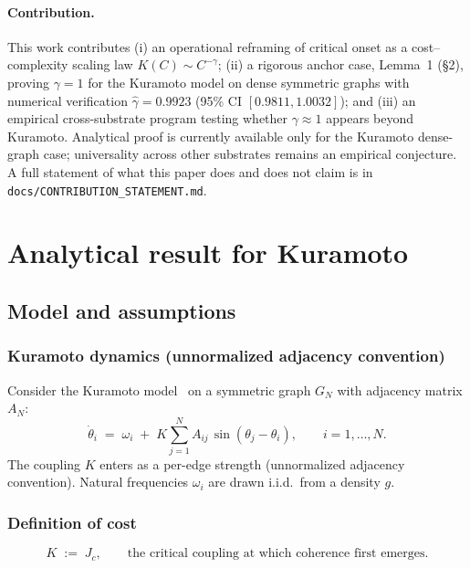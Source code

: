 \documentclass[11pt,a4paper,twocolumn]{article}
\begin{document}
\paragraph{Contribution.} This work contributes (i) an operational reframing of critical onset as a cost--complexity scaling law $K(C) \sim C^{-\gamma}$; (ii) a rigorous anchor case, Lemma~1 (§2), proving $\gamma = 1$ for the Kuramoto model on dense symmetric graphs with numerical verification $\hat\gamma = 0.9923$ (95\% CI $[0.9811, 1.0032]$); and (iii) an empirical cross-substrate program testing whether $\gamma \approx 1$ appears beyond Kuramoto. Analytical proof is currently available only for the Kuramoto dense-graph case; universality across other substrates remains an empirical conjecture. A full statement of what this paper does and does not claim is in \texttt{docs/CONTRIBUTION\_STATEMENT.md}.

\section{Analytical result for Kuramoto}
\label{sec:lemma1}

\subsection{Model and assumptions}
\label{sec:lemma1-model}

\subsubsection{Kuramoto dynamics (unnormalized adjacency convention)}

Consider the Kuramoto model~\cite{kuramoto1975} on a symmetric graph $G_N$ with adjacency matrix $A_N$:
\begin{equation}
\dot\theta_i \;=\; \omega_i \;+\; K \sum_{j=1}^{N} A_{ij}\,\sin(\theta_j - \theta_i),
\qquad i = 1, \dots, N.
\label{eq:kuramoto-unnormalized}
\end{equation}
The coupling $K$ enters as a per-edge strength (unnormalized adjacency convention). Natural frequencies $\omega_i$ are drawn i.i.d.\ from a density $g$.

\subsubsection{Definition of cost}

\begin{equation}
K \;:=\; J_c,
\qquad\text{the critical coupling at which coherence first emerges.}
\label{eq:cost-def}
\end{equation}
\end{document}

